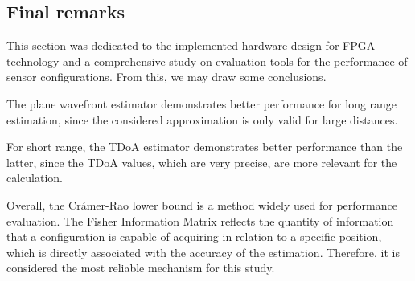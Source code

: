 \begin{table}[!htbp] %
	\begin{center}
		\caption{Obtained errors for configurations A,B and C by Crámer-Rao lower bound}
		\label{tab:fim-abc}
	\end{center}
\end{table}


\subsection{Final remarks}

This section was dedicated to the implemented hardware design for FPGA technology and a comprehensive study on evaluation tools for the performance of sensor configurations. From this, we may draw some conclusions.


The plane wavefront estimator demonstrates better performance for long range estimation, since the considered approximation is only valid for large distances. 

For short range, the TDoA estimator demonstrates better performance than the latter, since the TDoA values, which are very precise, are more relevant for the calculation.

Overall, the Crámer-Rao lower bound is a method widely used for performance evaluation. The Fisher Information Matrix reflects the quantity of information that a configuration is capable of acquiring in relation to a specific position, which is directly associated with the accuracy of the estimation.  Therefore, it is considered the most reliable mechanism for this study. 
